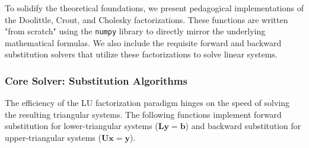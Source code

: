 To solidify the theoretical foundations, we present pedagogical implementations of the Doolittle, Crout, and Cholesky factorizations. These functions are written "from scratch" using the \texttt{numpy} library to directly mirror the underlying mathematical formulas. We also include the requisite forward and backward substitution solvers that utilize these factorizations to solve linear systems.

\subsubsection*{Core Solver: Substitution Algorithms}
The efficiency of the LU factorization paradigm hinges on the speed of solving the resulting triangular systems. The following functions implement forward substitution for lower-triangular systems ($\mathbf{L}\mathbf{y} = \mathbf{b}$) and backward substitution for upper-triangular systems ($\mathbf{U}\mathbf{x} = \mathbf{y}$).

